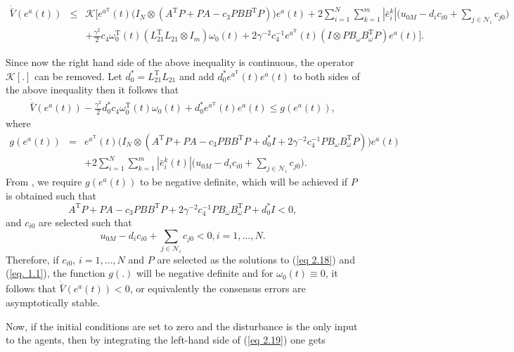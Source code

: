 \documentclass[12pt,draftcls,onecolumn]{IEEEtran}
\begin{document}
\begin{eqnarray*}
	\dot{\bar V}(e^a(t))&\leq&\mathcal{K}[e^{a^{\text{T}}}(t)\big(I_N\otimes ( A^{\text{T}}P+PA-c_3PBB^{\text{T}}P)\big)e^a(t)
	+2\sum_{i=1}^N\sum_{k=1}^{m}|\bar e_i^k|\big(u_{0M}-d_ic_{i0}+\sum_{j\in\mathcal{N}_i}c_{j0}\big)\\
	&&+\frac{\gamma^2}{2}c_4\omega_0^{\text{T}}(t)(L_{21}^{\text{T}}L_{21}\otimes I_m)\omega_0(t)+{2}{\gamma^{-2}}c_4^{-1}e^{a^{\text{T}}}(t)(I\otimes PB_{\omega}B_{\omega}^{\text{T}}P)e^a(t)].
\end{eqnarray*}\par
Since now the right hand side of the above inequality is continuous, the operator $\mathcal{K}[.]$ can be removed. Let $d_0^*=L_{21}^{\text{T}}L_{21}$  and add $d_0^* e^{a^{\text{T}}}(t)e^a(t)$ to both sides of the above inequality then it follows that 
\begin{eqnarray}
\dot {\bar V}(e^a(t))-\frac{\gamma^2}{2}d_0^*c_4\omega_0^{\text{T}}(t)\omega_0(t) +d_0^* {e}^{a^\text{T}}(t)e^a(t)\leq g(e^a(t)),\label{eq 2.19}
\end{eqnarray}
where
\begin{eqnarray*}
g(e^a(t))&=&e^{a^{\text{T}}}(t) \big(I_N\otimes (A^{\text{T}}P+PA-c_3PBB^{\text{T}}P+d_0^* I+{2}{\gamma^{-2}}c_4^{-1}PB_{\omega}B_{\omega}^{\text{T}}P)\big)e^a(t)\nonumber\\
&&+2 \sum_{i=1}^N\sum_{k=1}^{m}|\bar e_i^k(t)|\big(u_{0M}-d_ic_{i0}+\sum_{j\in\mathcal{N}_i}c_{j0}\big)   \label{eq. 1.9}.
\end{eqnarray*}
From \cite{Shevitz94}, we require  $g(e^a(t))$ to be negative definite, which will be achieved if $P$ is obtained such that
\begin{equation}
A^{\text{T}}P+PA-c_3PBB^{\text{T}}P+{2}{\gamma^{-2}}c_4^{-1}PB_{\omega}B_{\omega}^{\text{T}}P+d_0^* I<0,  \label{eq. 1.1}
\end{equation}
and $c_{i0}$ are selected such that
\begin{equation}
u_{0M}-d_ic_{i0}+\sum_{j\in\mathcal{N}_i}c_{j0} < 0, i=1,\dots,N.\label{eq 2.18}
\end{equation}
Therefore, if $c_{i0}$, $i=1,\dots,N$ and $P$ are selected as the solutions to (\ref{eq 2.18}) and (\ref{eq. 1.1}),  the function $g(.)$ will be negative definite  and for $\omega_0(t)\equiv 0$, it follows that  $\dot{\bar V}(e^a(t))<0$, or equivalently the consensus errors are asymptotically stable. \par
Now, if the initial conditions are set to zero and the disturbance is the only input to the agents, then by integrating the left-hand side of (\ref{eq 2.19}) one gets 
\end{document}
